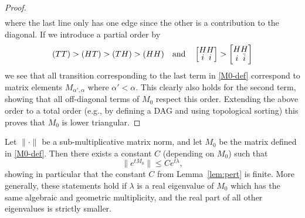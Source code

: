 \documentclass[11pt]{article}
\begin{document}
\begin{proof}
\begin{align}
\end{align}
where the last line only has one edge since the other is a contribution to the diagonal. If we introduce a partial order by 
\[
\renewcommand{\arraystretch}{0.7}
(TT) > (HT) > (TH) > (HH)
\quad\text{and}\quad
\left[
\begin{array}{@{}c@{}c@{}c@{}c@{}}
H & H\\
i & i
\end{array}\right]
>
\left[
\begin{array}{@{}c@{}c@{}c@{}c@{}}
H & H\\
i & \bar i
\end{array}
\right]
\]
we see that 
all transition corresponding to the last term in \eqref{M0-def} correspond to matrix elements $M_{\alpha',\alpha}$ where $\alpha'<\alpha$.  This clearly also holds for the second term, showing that all off-diagonal terms of $M_0$ respect this order.  Extending the above order to a total order (e.g., by defining a DAG and using topological sorting) this proves that $M_0$ is lower triangular.
\end{proof}

\begin{corollary}\label{cor:etM0-decay}
Let $\|\cdot\|$ be a sub-multiplicative matrix norm, and let $M_0$ be the matrix defined in \eqref{M0-def}. Then there exists a constant $C$ (depending on $M_0$) such that
\begin{equation}
\label{etM0-decay}
\|e^{tM_0}\|\leq C e^{t\lambda},
\end{equation}
showing in particular that the constant $C$ from Lemma~\ref{lem:pert} is finite.  More generally, these statements hold if $\lambda$ is a real eigenvalue of $M_0$ which has the same algebraic and geometric multiplicity, and the real part of all other eigenvalues is strictly smaller.
\end{corollary}
\end{document}
